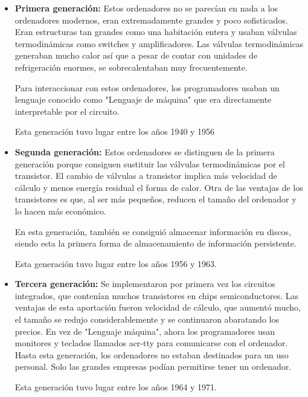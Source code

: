 \documentclass[titlepage, 12pt, a4paper]{article}
\begin{document}
\begin{itemize}
	\item{\textbf{Primera generación: }}Estos ordenadores no se parecían en nada a los ordenadores modernos, eran extremadamente grandes y poco sofisticados. Eran estructuras tan grandes como una habitación entera y usaban válvulas termodinámicas como switches y amplificadores. Las válvulas termodinámicas generaban mucho calor así que a pesar de contar con unidades de refrigeración enormes, se sobrecalentaban muy frecuentemente.\par Para interaccionar con estos ordenadores, los programadores usaban un lenguaje conocido como "Lenguaje de máquina" que era directamente interpretable por el circuito.\par Esta generación tuvo lugar entre los años 1940 y 1956
	\item{\textbf{Segunda generación: }}Estos ordenadores se distinguen de la primera generación porque consiguen sustituir las válvulas termodinámicas por el  transistor. El cambio de válvulas a transistor implica más velocidad de cálculo y menos energía residual el forma de calor. Otra de las ventajas de los transistores es que, al ser más pequeños, reducen el tamaño del ordenador y lo hacen más económico.\par En esta generación, también se consiguió almacenar información en discos, siendo esta la primera forma de almacenamiento de información persistente.\par Esta generación tuvo lugar entre los años 1956 y 1963.
	\item{\textbf{Tercera generación: }}Se implementaron por primera vez los circuitos integrados, que contenían muchos transistores en chips semiconductores. Las ventajas de esta aportación fueron velocidad de cálculo, que aumentó mucho, el tamaño se redujo considerablemente y se continuaron abaratando los precios. En vez de "Lenguaje máquina", ahora los programadores usan monitores y teclados llamados \gls{acr-tty} para comunicarse con el ordenador. Hasta esta generación, los ordenadores no estaban destinados para un uso personal. Solo las grandes empresas podían permitirse tener un ordenador.\par Esta generación tuvo lugar entre los años 1964 y 1971.

\end{itemize}
\end{document}
